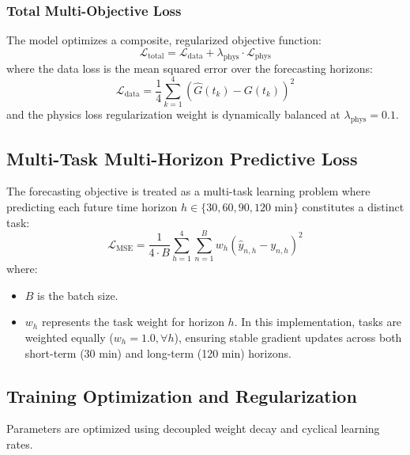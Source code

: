 \documentclass[10pt,journal,compsoc,twocolumn]{IEEEtran}
\begin{document}
\subsubsection{Total Multi-Objective Loss}
The model optimizes a composite, regularized objective function:
\begin{equation}
\mathcal{L}_{\text{total}} = \mathcal{L}_{\text{data}} + \lambda_{\text{phys}} \cdot \mathcal{L}_{\text{phys}}
\end{equation}
where the data loss is the mean squared error over the forecasting horizons:
\begin{equation}
\mathcal{L}_{\text{data}} = \frac{1}{4} \sum_{k=1}^4 \left(\hat{G}(t_k) - G(t_k)\right)^2
\end{equation}
and the physics loss regularization weight is dynamically balanced at $\lambda_{\text{phys}} = 0.1$.

\subsection{Multi-Task Multi-Horizon Predictive Loss}
The forecasting objective is treated as a multi-task learning problem where predicting each future time horizon $h \in \{30, 60, 90, 120\text{ min}\}$ constitutes a distinct task:
\begin{equation}
\mathcal{L}_{\text{MSE}} = \frac{1}{4 \cdot B} \sum_{h=1}^4 \sum_{n=1}^B w_h \left(\hat{y}_{n,h} - y_{n,h}\right)^2
\end{equation}
where:
\begin{itemize}
    \item $B$ is the batch size.
    \item $w_h$ represents the task weight for horizon $h$. In this implementation, tasks are weighted equally ($w_h = 1.0, \forall h$), ensuring stable gradient updates across both short-term (30 min) and long-term (120 min) horizons.
\end{itemize}

\subsection{Training Optimization and Regularization}
Parameters are optimized using decoupled weight decay and cyclical learning rates.
\end{document}
